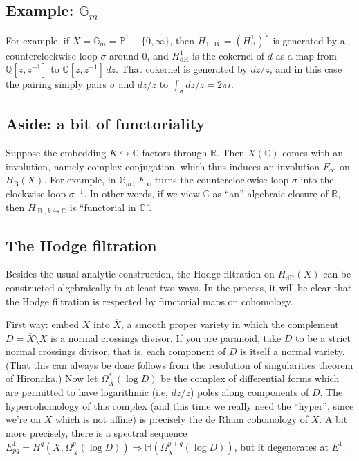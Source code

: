 \documentclass[12pt]{article}
\def\CC{\mathbb{C}}
\def\GG{\mathbb{G}}
\def\HH{\mathbb{H}}
\def\PP{\mathbb{P}}
\def\QQ{\mathbb{Q}}
\def\RR{\mathbb{R}}
\def\dual{\vee}
\DeclareMathOperator{\B}{B}
\DeclareMathOperator{\dR}{dR}
\begin{document}
\subsection*{Example: $\GG_m$}
For example, if $X = \GG_m = \PP^1 - \{0, \infty\}$, then $H_{1,\B} =
(H^1_{\B})^\dual$ is generated by a counterclockwise loop $\sigma$ around
0, and $H^1_{\dR}$ is the cokernel of $d$ as a map from $\QQ[z, z^{-1}]$
to $\QQ[z, z^{-1}] \,dz$. That cokernel is generated by $dz/z$, and in this
case the pairing simply pairs $\sigma$ and $dz/z$ to $\int_\sigma dz/z
= 2 \pi i$.

\subsection*{Aside: a bit of functoriality}

Suppose the embedding $K \hookrightarrow \CC$ factors through $\RR$.
Then $X(\CC)$ comes with an involution, namely complex conjugation,
which thus induces an involution $F_\infty$ on $H_{\B}(X)$. For example,
in $\GG_m$, $F_\infty$ turns the counterclockwise loop $\sigma$ into the
clockwise loop $\sigma^{-1}$. In other words, if we view $\CC$ as
``an'' algebraic closure of $\RR$, then $H_{\B, k \hookrightarrow \CC}$
is ``functorial in $\CC$''.

\subsection*{The Hodge filtration}

Besides the usual analytic construction, the Hodge filtration on
$H_{\dR}(X)$ can be constructed algebraically in at least two ways.
In the process, it will be clear that the Hodge filtration is respected
by functorial maps on cohomology.

First way: embed $X$ into $\overline{X}$, a smooth proper variety in which the
complement $D = \overline{X} \setminus X$ is a normal crossings divisor. If you
are paranoid, take $D$ to be a strict normal crossings divisor, that is,
each component of $D$ is itself a normal variety. (That
this can always 
be done follows from the resolution of singularities theorem
of Hironaka.) Now let $\Omega_{\overline{X}}^*(\log D)$ be the complex of 
differential forms which are permitted to have logarithmic (i.e, $dz/z$)
poles along components of $D$. The hypercohomology of this complex (and
this time we really need the ``hyper'', since we're on $\overline{X}$
which is not affine) is precisely the de Rham cohomology of $X$. A bit
more precisely, there is a spectral sequence
$E^1_{pq}= H^q(\overline{X}, \Omega^p_{\overline{X}}(\log D))
\Rightarrow \HH(\Omega_{\overline{X}}^{p+q}(\log D))$,
but it degenerates at $E^1$.
\end{document}
